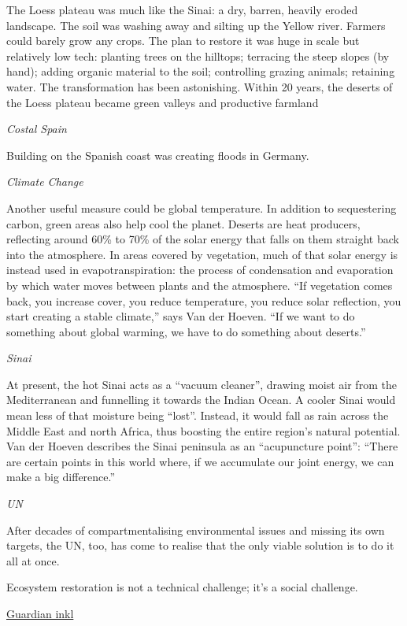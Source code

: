 \documentclass[
]{book}
\begin{document}
The Loess plateau was much like the Sinai: a dry, barren, heavily eroded landscape. The soil was washing away and silting up the Yellow river. Farmers could barely grow any crops. The plan to restore it was huge in scale but relatively low tech: planting trees on the hilltops; terracing the steep slopes (by hand); adding organic material to the soil; controlling grazing animals; retaining water. The transformation has been astonishing. Within 20 years, the deserts of the Loess plateau became green valleys and productive farmland

\emph{Costal Spain}

Building on the Spanish coast was creating floods in Germany.

\emph{Climate Change}

Another useful measure could be global temperature. In addition to sequestering carbon, green areas also help cool the planet. Deserts are heat producers, reflecting around 60\% to 70\% of the solar energy that falls on them straight back into the atmosphere. In areas covered by vegetation, much of that solar energy is instead used in evapotranspiration: the process of condensation and evaporation by which water moves between plants and the atmosphere. ``If vegetation comes back, you increase cover, you reduce temperature, you reduce solar reflection, you start creating a stable climate,'' says Van der Hoeven. ``If we want to do something about global warming, we have to do something about deserts.''

\emph{Sinai}

At present, the hot Sinai acts as a ``vacuum cleaner'', drawing moist air from the Mediterranean and funnelling it towards the Indian Ocean. A cooler Sinai would mean less of that moisture being ``lost''. Instead, it would fall as rain across the Middle East and north Africa, thus boosting the entire region's natural potential. Van der Hoeven describes the Sinai peninsula as an ``acupuncture point'': ``There are certain points in this world where, if we accumulate our joint energy, we can make a big difference.''

\emph{UN}

After decades of compartmentalising environmental issues and missing its own targets,
the UN, too, has come to realise that the only viable solution is to do it all at once.

Ecosystem restoration is not a technical challenge; it's a social challenge.

\href{https://www.inkl.com/news/our-biggest-challenge-lack-of-imagination-the-scientists-turning-the-desert-green}{Guardian inkl}
\end{document}
